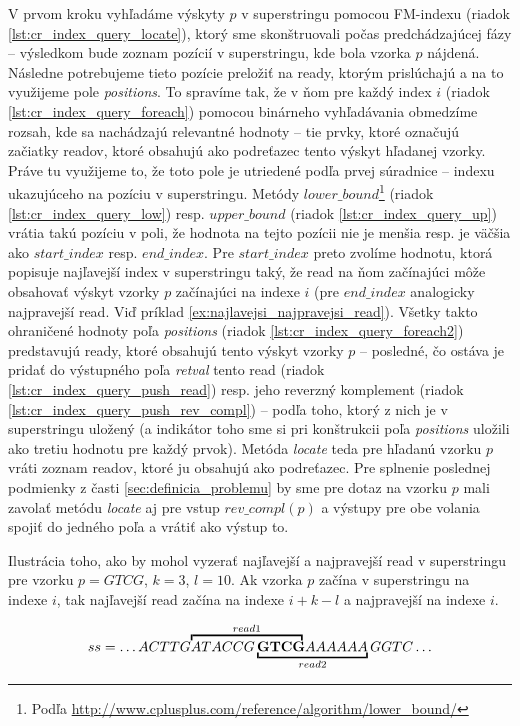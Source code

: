 V prvom kroku vyhľadáme výskyty $p$ v superstringu pomocou FM-indexu (riadok \ref{lst:cr_index_query_locate}), ktorý sme skonštruovali počas predchádzajúcej fázy -- výsledkom bude zoznam pozícií v superstringu, kde bola vzorka $p$ nájdená. Následne potrebujeme tieto pozície preložiť na ready, ktorým prislúchajú a na to využijeme pole \emph{positions}. To spravíme tak, že v ňom pre každý index $i$ (riadok \ref{lst:cr_index_query_foreach}) pomocou binárneho vyhľadávania obmedzíme rozsah, kde sa nachádzajú relevantné hodnoty -- tie prvky, ktoré označujú začiatky readov, ktoré obsahujú ako podreťazec tento výskyt hľadanej vzorky. Práve tu využijeme to, že toto pole je utriedené podľa prvej súradnice -- indexu ukazujúceho na pozíciu v superstringu. Metódy $lower\_bound$\footnote{Podľa \url{http://www.cplusplus.com/reference/algorithm/lower_bound/}} (riadok \ref{lst:cr_index_query_low}) resp. $upper\_bound$ (riadok \ref{lst:cr_index_query_up}) vrátia takú pozíciu v poli, že hodnota na tejto pozícii nie je menšia resp. je väčšia ako $start\_index$ resp. $end\_index$. Pre $start\_index$ preto zvolíme hodnotu, ktorá popisuje najľavejší index v superstringu taký, že read na ňom začínajúci môže obsahovať výskyt vzorky $p$ začínajúci na indexe $i$ (pre $end\_index$ analogicky najpravejší read. Viď príklad \ref{ex:najlavejsi_najpravejsi_read}). Všetky takto ohraničené hodnoty poľa \emph{positions} (riadok \ref{lst:cr_index_query_foreach2}) predstavujú ready, ktoré obsahujú tento výskyt vzorky $p$ -- posledné, čo ostáva je pridať do výstupného poľa \emph{retval} tento read (riadok \ref{lst:cr_index_query_push_read}) resp. jeho reverzný komplement (riadok \ref{lst:cr_index_query_push_rev_compl}) -- podľa toho, ktorý z nich je v superstringu uložený (a indikátor toho sme si pri konštrukcii poľa \emph{positions} uložili ako tretiu hodnotu pre každý prvok). Metóda \emph{locate} teda pre hľadanú vzorku $p$ vráti zoznam readov, ktoré ju obsahujú ako podreťazec. Pre splnenie poslednej podmienky z časti \ref{sec:definicia_problemu} by sme pre dotaz na vzorku $p$ mali zavolať metódu \emph{locate} aj pre vstup $rev\_compl(p)$ a výstupy pre obe volania spojiť do jedného poľa a vrátiť ako výstup to.

\bigskip
\begin{example}
\label{ex:najlavejsi_najpravejsi_read}
Ilustrácia toho, ako by mohol vyzerať najľavejší a najpravejší read v superstringu pre vzorku $p=GTCG$, $k=3$, $l=10$. Ak vzorka $p$ začína v superstringu na indexe $i$, tak najľavejší read začína na indexe $i+k-l$ a najpravejší na indexe $i$.

$$
  ss=
  \ldots
  ACTTG
  \rlap{$\overbracket{\phantom{ATACCG              \mathbf{GTCG}}}^{read 1}$}
                               ATACCG\underbracket{\mathbf{GTCG}             AAAAAA}_{read 2}
  GGTC
  \ldots
$$
\end{example}
\bigskip

